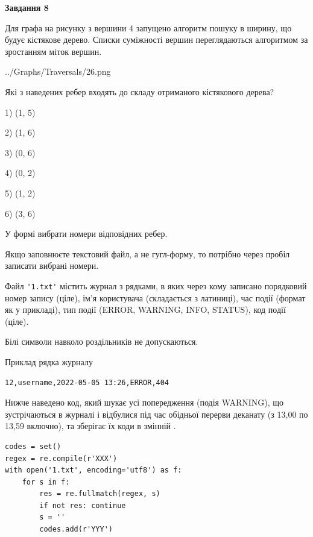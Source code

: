 \documentclass[12pt, ukrainian]{article}
\def\code#1{\Verb!#1!}
\begin{document}
{\begin {large}
{\begin {center}\textbf{Завдання 8}\end {center}}\par
Для графа на рисунку з вершини 4 запущено алгоритм пошуку в ширину, що будує кістякове дерево. Списки суміжності вершин переглядаються алгоритмом за зростанням міток вершин.\par
\begin{center}
	{../Graphs/Traversals/26.png}
\end{center}
\par Які з наведених ребер входять до складу отриманого кістякового дерева?\par
1) (1, 5)\par
2) (1, 6)\par
3) (0, 6)\par
4) (0, 2)\par
5) (1, 2)\par
6) (3, 6)\par
{\vskip 15pt} У формі вибрати номери відповідних ребер.


Якщо заповнюєте текстовий файл, а не гугл-форму, то потрібно через пробіл записа\-ти вибрані номери.\par
\newpage


Файл \code{'1.txt'} містить журнал з рядками, в яких через кому записано поряд\-ко\-вий номер запису (ціле), ім'я користувача (складається з латиниці), час події (фор\-мат як у прикладі), тип події (ERROR, WARNING, INFO, STATUS), код події (ціле).

Білі символи навколо роздільників не допускаються.

Приклад рядка журналу



\begin{verbatim}
12,username,2022-05-05 13:26,ERROR,404
\end{verbatim}


Нижче наведено код, який шукає усі попередження (подія WARNING), що зустрі\-ча\-ються в журналі і відбулися під час обідньої перерви деканату (з 13,00 по 13,59 включно), та зберігає їх коди в змінній .



\begin{verbatim}
codes = set()
regex = re.compile(r'XXX')
with open('1.txt', encoding='utf8') as f:
    for s in f:
        res = re.fullmatch(regex, s)
        if not res: continue
        s = ''
        codes.add(r'YYY')
\end{verbatim}





\end{large}}
\end{document}
